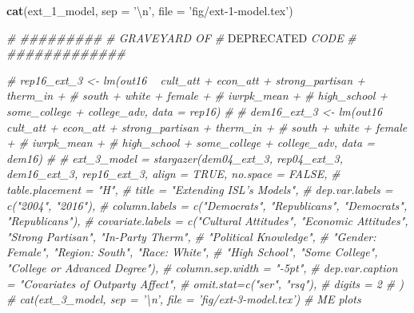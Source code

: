 \documentclass[
]{article}
\newenvironment{Shaded}{\begin{snugshade}}{\end{snugshade}}
\newcommand{\AlertTok}[1]{\textcolor[rgb]{0.94,0.16,0.16}{#1}}
\newcommand{\CharTok}[1]{\textcolor[rgb]{0.31,0.60,0.02}{#1}}
\newcommand{\CommentTok}[1]{\textcolor[rgb]{0.56,0.35,0.01}{\textit{#1}}}
\newcommand{\DataTypeTok}[1]{\textcolor[rgb]{0.13,0.29,0.53}{#1}}
\newcommand{\DecValTok}[1]{\textcolor[rgb]{0.00,0.00,0.81}{#1}}
\newcommand{\KeywordTok}[1]{\textcolor[rgb]{0.13,0.29,0.53}{\textbf{#1}}}
\newcommand{\NormalTok}[1]{#1}
\newcommand{\StringTok}[1]{\textcolor[rgb]{0.31,0.60,0.02}{#1}}
\begin{document}
\begin{Shaded}
\begin{Highlighting}[]
\KeywordTok{cat}\NormalTok{(ext_}\DecValTok{1}\NormalTok{_model, }\DataTypeTok{sep =} \StringTok{'}\CharTok{\textbackslash{}n}\StringTok{'}\NormalTok{, }\DataTypeTok{file =} \StringTok{'fig/ext-1-model.tex'}\NormalTok{)}

\CommentTok{# #########}
\CommentTok{# GRAVEYARD OF}
\CommentTok{# }\AlertTok{DEPRECATED}\CommentTok{ CODE}
\CommentTok{# #############}

\CommentTok{# rep16_ext_3 <- lm(out16 ~ cult_att + econ_att + strong_partisan + therm_in +}
\CommentTok{#                                       south + white + female +}
\CommentTok{#                                       iwrpk_mean +}
\CommentTok{#                                       high_school + some_college + college_adv, data = rep16)}
\CommentTok{# }
\CommentTok{# dem16_ext_3 <- lm(out16 ~ cult_att + econ_att + strong_partisan + therm_in +}
\CommentTok{#                                       south + white + female +}
\CommentTok{#                                       iwrpk_mean +}
\CommentTok{#                                       high_school + some_college + college_adv, data = dem16)}
\CommentTok{# }
\CommentTok{# ext_3_model = stargazer(dem04_ext_3, rep04_ext_3, dem16_ext_3, rep16_ext_3, align = TRUE, no.space = FALSE,}
\CommentTok{#                                               table.placement = "H",}
\CommentTok{#                                               title = "Extending ISL's Models",}
\CommentTok{#                                               dep.var.labels = c("2004", "2016"),}
\CommentTok{#                                               column.labels = c("Democrats", "Republicans", "Democrats", "Republicans"),}
\CommentTok{#                                               covariate.labels = c("Cultural Attitudes", "Economic Attitudes", "Strong Partisan", "In-Party Therm",}
\CommentTok{#                                                                                        "Political Knowledge",}
\CommentTok{#                                                                                        "Gender: Female", "Region: South", "Race: White",}
\CommentTok{#                                                                                        "High School", "Some College", "College or Advanced Degree"),}
\CommentTok{#                                               column.sep.width = "-5pt",}
\CommentTok{#                                               dep.var.caption = "Covariates of Outparty Affect",}
\CommentTok{#                                               omit.stat=c("ser", "rsq"),}
\CommentTok{#                                               digits = 2}
\CommentTok{# )}
\CommentTok{# cat(ext_3_model, sep = '\textbackslash{}n', file = 'fig/ext-3-model.tex')}
\CommentTok{# ME plots}


\end{Highlighting}
\end{Shaded}
\end{document}
